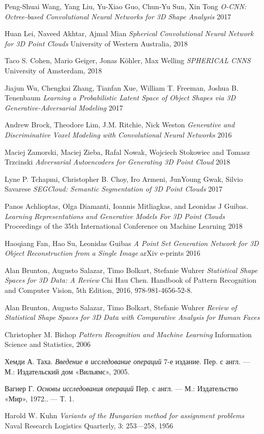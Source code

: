 \begin{thebibliography}{00}
 Peng-Shuai Wang, Yang Liu, Yu-Xiao Guo, Chun-Yu Sun, Xin Tong
\emph{O-CNN: Octree-based Convolutional Neural Networks for 3D Shape Analysis} 2017

 Huan Lei, Naveed Akhtar, Ajmal Mian
\emph{Spherical Convolutional Neural Network for 3D Point Clouds} University of Western Australia, 2018

 Taco S. Cohen, Mario Geiger, Jonas Köhler, Max Welling
\emph{SPHERICAL CNNS} University of Amsterdam, 2018

 Jiajun Wu, Chengkai Zhang, Tianfan Xue, William T. Freeman, Joshua B. Tenenbaum
\emph{Learning a Probabilistic Latent Space of Object Shapes via 3D Generative-Adversarial Modeling} 2017

 Andrew Brock, Theodore Lim, J.M. Ritchie, Nick Weston
\emph{Generative and Discriminative Voxel Modeling with Convolutional Neural Networks} 2016

 Maciej Zamorski, Maciej Zieba, Rafal Nowak, Wojciech Stokowiec and Tomasz Trzcinski
\emph{Adversarial Autoencoders for Generating 3D Point Cloud} 2018

 Lyne P. Tchapmi, Christopher B. Choy, Iro Armeni, JunYoung Gwak, Silvio Savarese
\emph{SEGCloud: Semantic Segmentation of 3D Point Clouds} 2017

 Panos Achlioptas, Olga Diamanti, Ioannis Mitliagkas, and Leonidas J Guibas.
\emph{Learning Representations and Generative Models For 3D Point Clouds} Proceedings
of the 35th International Conference on Machine Learning 2018

 Haoqiang Fan, Hao Su, Leonidas Guibas
\emph{A Point Set Generation Network for 3D Object Reconstruction from a Single Image} arXiv e-prints 2016

 Alan Brunton, Augusto Salazar, Timo Bolkart, Stefanie Wuhrer
\emph{Statistical Shape Spaces for 3D Data: A Review} Chi Hau Chen. Handbook of Pattern Recognition and Computer Vision, 5th Edition, 2016, 978-981-4656-52-8. 

 Alan Brunton, Augusto Salazar, Timo Bolkart, Stefanie Wuhrer
\emph{Review of Statistical Shape Spaces for 3D Data with Comparative Analysis for Human Faces}

 Christopher M. Bishop
\emph{Pattern Recognition and Machine Learning} Information Science and Statistics, 2006


 Хемди А. Таха.
\emph{Введение в исследование операций} 7-е издание. Пер. с англ. — М.: Издательский дом «Вильямс», 2005.

 Вагнер Г.
\emph{Основы исследования операций} Пер. с англ. — М.: Издательство «Мир», 1972.. — Т. 1.

 Harold W. Kuhn
\emph{Variants of the Hungarian method for assignment problems} Naval Research Logistics Quarterly, 3: 253—258, 1956


\end{thebibliography}